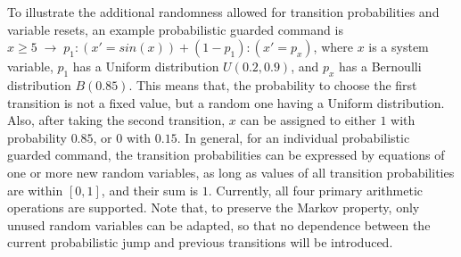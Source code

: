 To illustrate the additional randomness allowed for transition probabilities and variable resets, an example probabilistic guarded command is $x \geq 5 \; \rightarrow \; p_1:(x' = sin(x)) + (1-p_1):(x' = p_x)$, where $x$ is a system variable, $p_1$ has a Uniform distribution $U(0.2, 0.9)$, and $p_x$ has a Bernoulli distribution $B(0.85)$. This means that, the probability to choose the first transition is not a fixed value, but a random one having a Uniform distribution. Also, after taking the second transition, $x$ can be assigned to either $1$ with probability $0.85$, or $0$ with $0.15$. In general, for an individual probabilistic guarded command, the transition probabilities can be expressed by equations of one or more new random variables, as long as values of all transition probabilities are within $[0, 1]$, and their sum is $1$. Currently, all four primary arithmetic operations are supported. Note that, to preserve the Markov property, only unused random variables can be adapted, so that no dependence between the current probabilistic jump and previous transitions will be introduced. 





